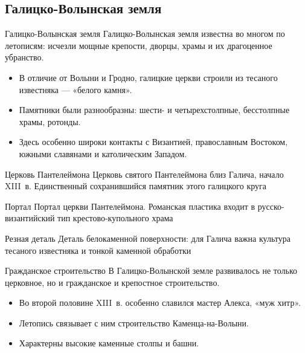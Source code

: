 \subsection{Галицко-Волынская земля}

\begin{frame}{Галицко-Волынская земля}
  Галицко-Волынская земля известна во многом по летописям:
  исчезли мощные крепости, дворцы, храмы и их драгоценное убранство.

  \begin{itemize}
    \item В отличие от Волыни и Гродно, галицкие церкви строили
          из тесаного известняка --- «белого камня».
    \item Памятники были разнообразны: шести- и четырехстолпные,
          бесстолпные храмы, ротонды.
    \item Здесь особенно широки контакты с Византией,
          православным Востоком, южными славянами
          и католическим Западом.
  \end{itemize}
\end{frame}

\begin{frame}{Церковь Пантелеймона}
    {Церковь святого Пантелеймона близ Галича,
     начало XIII~в. Единственный сохранившийся памятник
     этого галицкого круга}
\end{frame}

\begin{frame}{Портал}
    {Портал церкви Пантелеймона.
     Романская пластика входит в русско-византийский
     тип крестово-купольного храма}
\end{frame}

\begin{frame}{Резная деталь}
    {Деталь белокаменной поверхности:
     для Галича важна культура тесаного известняка
     и тонкой каменной обработки}
\end{frame}

\begin{frame}{Гражданское строительство}
  В Галицко-Волынской земле развивалось не только церковное,
  но и гражданское и крепостное строительство.
  \begin{itemize}
    \item Во второй половине XIII~в. особенно славился мастер Алекса,
          «муж хитр».
    \item Летопись связывает с ним строительство Каменца-на-Волыни.
    \item Характерны высокие каменные столпы и башни.
  \end{itemize}
\end{frame}


